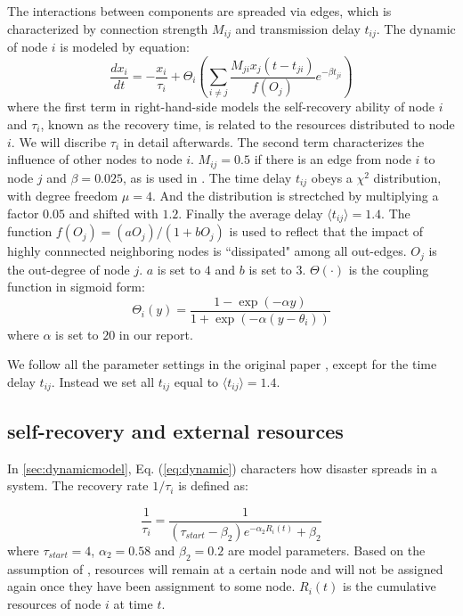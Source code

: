 The interactions between components are spreaded via edges, which is characterized by connection strength $M_{ij}$ and transmission delay $t_{ij}$. The dynamic of node $i$ is modeled by equation:
\begin{equation}
	\label{eq:dynamic}
	\frac{dx_i}{dt} = - \frac{x_i}{\tau_i} + \Theta_i ( \sum_{i\neq j}\frac{M_{ji}x_j(t-t_{ji})}{f(O_j)} e^{-\beta t_{ji}} )
\end{equation}
%
where the first term in right-hand-side models the self-recovery ability of node $i$ and $\tau_i$, known as the recovery time, is related to the resources distributed to node $i$. We will discribe $\tau_i$ in detail afterwards. The second term characterizes the influence of other nodes to node $i$. $M_{ij} = 0.5$ if there is an edge from node $i$ to node $j$ and $\beta=0.025$, as is used in \cite{buzna2007efficient}. The time delay $t_{ij}$ obeys a $\chi^2$ distribution, with degree freedom $\mu=4$. And the distribution is strectched by multiplying a factor $0.05$ and shifted with $1.2$. Finally the average delay $\langle t_{ij} \rangle = 1.4$. The function $f(O_j) = (a O_j) / (1 + b O_j)$ is used to reflect that the impact of highly connnected neighboring nodes is ``dissipated" among all out-edges. $O_j$ is the out-degree of node $j$. $a$ is set to $4$ and $b$ is set to $3$. $\Theta(\cdot)$ is the coupling function in sigmoid form:
%
\begin{equation}
	\label{eq:sigmoid}
	\Theta_i(y) = \frac{1-\exp(-\alpha y)}{1+\exp(-\alpha (y-\theta_i))}
\end{equation}
where $\alpha$ is set to $20$ in our report.

We follow all the parameter settings in the original paper \cite{buzna2007efficient}, except for the time delay $t_{ij}$. Instead we set all $t_{ij}$ equal to $\langle t_{ij} \rangle = 1.4$.

\subsection{self-recovery and external resources}
In \ref{sec:dynamicmodel}, Eq. (\ref{eq:dynamic}) characters how disaster spreads in a system. The recovery rate $1 / \tau_i$ is defined as:

\begin{equation}
	\label{eq:taufun}
	\frac{1}{\tau_i} = \frac{1}{(\tau_{start} - \beta_2) e^{-\alpha_2 R_i(t)} + \beta_2}
\end{equation}
%
where $\tau_{start}=4$, $\alpha_2=0.58$ and $\beta_2=0.2$ are model parameters. Based on the assumption of \cite{buzna2007efficient}, resources will remain at a certain node and will not be assigned again once they have been assignment to some node. $R_i(t)$ is the cumulative resources of node $i$ at time $t$. 

